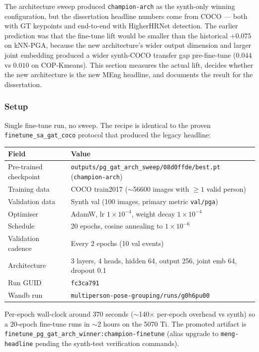 The architecture sweep produced \texttt{champion-arch} as the synth-only winning configuration, but the dissertation headline numbers come from COCO --- both with GT keypoints and end-to-end with HigherHRNet detection.
The earlier prediction was that the fine-tune lift would be smaller than the historical $+0.075$ on kNN-PGA, because the new architecture's wider output dimension and larger joint embedding produced a wider synth-COCO transfer gap pre-fine-tune ($0.044$ vs $0.010$ on COP-Kmeans).
This section measures the actual lift, decides whether the new architecture is the new MEng headline, and documents the result for the dissertation.

\subsubsection{Setup}

Single fine-tune run, no sweep. The recipe is identical to the proven \texttt{finetune\_sa\_gat\_coco} protocol that produced the legacy headline:

\begin{tabular}{ll}
\hline
\textbf{Field} & \textbf{Value} \\
\hline
Pre-trained checkpoint & \texttt{outputs/pg\_gat\_arch\_sweep/08d0ffde/best.pt} (\texttt{champion-arch}) \\
Training data           & COCO train2017 ($\sim$56600 images with $\geq 1$ valid person) \\
Validation data         & Synth val (100 images, primary metric \texttt{val/pga}) \\
Optimiser               & AdamW, lr $1\!\times\!10^{-4}$, weight decay $1\!\times\!10^{-4}$ \\
Schedule                & 20 epochs, cosine annealing to $1\!\times\!10^{-6}$ \\
Validation cadence      & Every 2 epochs (10 val events) \\
Architecture            & 3 layers, 4 heads, hidden 64, output 256, joint emb 64, dropout 0.1 \\
Run GUID                & \texttt{fc3ca791} \\
Wandb run               & \texttt{multiperson-pose-grouping/runs/g0h6pu00} \\
\hline
\end{tabular}

\vspace{0.5em}

Per-epoch wall-clock around $370$ seconds ($\sim$140$\times$ per-epoch overhead vs synth) so a 20-epoch fine-tune runs in $\sim$2 hours on the 5070 Ti.
The promoted artifact is \texttt{finetune\_pg\_gat\_arch\_winner:champion-finetune} (alias upgrade to \texttt{meng-headline} pending the synth-test verification commands).

